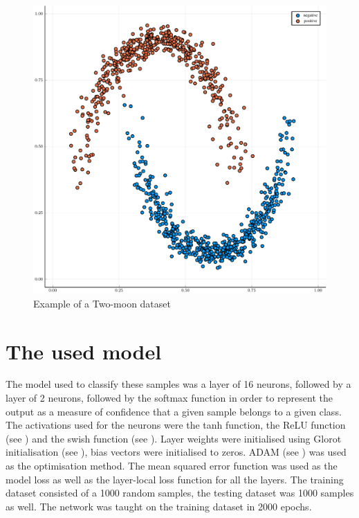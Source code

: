 \begin{figure}
	\centering
	\includegraphics[width=\textwidth]{images/two-moon/two-moon.pdf}
	\caption{Example of a Two-moon dataset}\label{twomoon}
\end{figure}

\section{The used model}\label{model}

The model used to classify these samples was a layer of 16 neurons, followed by a layer of 2 neurons, followed by the softmax function in order to represent the output as a measure of confidence that a given sample belongs to a given class. The activations used for the neurons were the tanh function, the ReLU function (see \cite{hahnloser_digital_2000}) and the swish function (see \cite{ramachandran_searching_2018}). Layer weights were initialised using Glorot initialisation (see \cite{glorot_understanding_2010}), bias vectors were initialised to zeros. ADAM (see \cite{kingma_adam:_2014}) was used as the optimisation method. The mean squared error function was used as the model loss as well as the layer-local loss function for all the layers. The training dataset consisted of a 1000 random samples, the testing dataset was 1000 samples as well. The network was taught on the training dataset in 2000 epochs.

